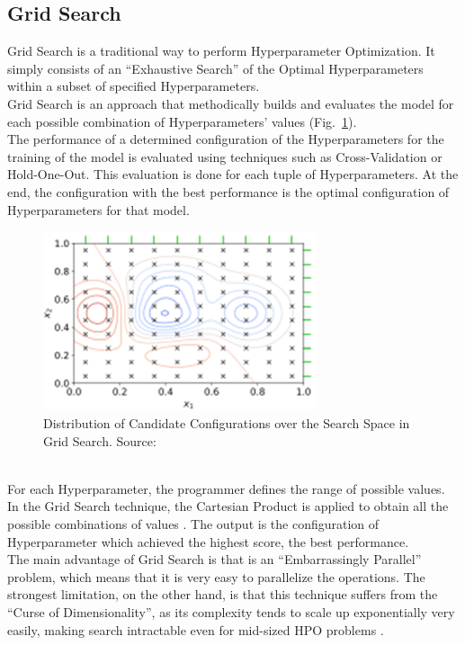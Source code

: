 \subsection{Grid Search}

Grid Search is a traditional way to perform Hyperparameter Optimization. It simply consists of an “Exhaustive Search” of the Optimal Hyperparameters within a subset of specified Hyperparameters.
\\[0.3cm]Grid Search is an approach that methodically builds and evaluates the model for each possible combination of Hyperparameters' values (Fig.~\ref{fig:figure-2.2.2}).
\\[0.3cm]The performance of a determined configuration of the Hyperparameters for the training of the model is evaluated using techniques such as Cross-Validation or Hold-One-Out.
This evaluation is done for each tuple of Hyperparameters. At the end, the configuration with the best performance is the optimal configuration of Hyperparameters for that model.
\begin{figure}[t]
	\centering
	\includegraphics[width=8cm]{figures/figure-2.2.2.png}
	\caption[Candidates Distribution in Grid Search]{Distribution of Candidate Configurations over the Search Space in Grid Search. Source:~\cite{Tesi-1.1}}
	\label{fig:figure-2.2.2}
\end{figure}
%
\\[0.3cm]For each Hyperparameter, the programmer defines the range of possible values. In the Grid Search technique, the Cartesian Product is applied to obtain all the possible combinations of values \cite{Tesi-1.2}.
The output is the configuration of Hyperparameter which achieved the highest score, the best performance.
%
\\[0.3cm]The main advantage of Grid Search is that is an “Embarrassingly Parallel” problem, which means that it is very easy to parallelize the operations.
The strongest limitation, on the other hand, is that this technique suffers from the “Curse of Dimensionality”, as its complexity tends to scale up exponentially very easily, making search intractable even for mid-sized HPO problems \cite{Tesi-1.10}.

